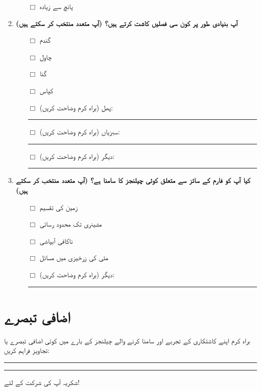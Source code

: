 \documentclass[12pt]{article}
\begin{document}
\begin{urdu}
\begin{enumerate}[label=\arabic*.]
\begin{itemize}
        \item [$\Box$] پانچ سے زیادہ
    \end{itemize}
    \item \textbf{آپ بنیادی طور پر کون سی فصلیں کاشت کرتے ہیں؟ (آپ متعدد منتخب کر سکتے ہیں)}
    \begin{itemize}
        \item [$\Box$] گندم
        \item [$\Box$] چاول
        \item [$\Box$] گنا
        \item [$\Box$] کپاس
        \item [$\Box$] پھل (براہ کرم وضاحت کریں): \rule{10cm}{0.4pt}
        \item [$\Box$] سبزیاں (براہ کرم وضاحت کریں): \rule{10cm}{0.4pt}
        \item [$\Box$] دیگر (براہ کرم وضاحت کریں): \rule{10cm}{0.4pt}
    \end{itemize}
    \item \textbf{کیا آپ کو فارم کے سائز سے متعلق کوئی چیلنجز کا سامنا ہے؟ (آپ متعدد منتخب کر سکتے ہیں)}
    \begin{itemize}
        \item [$\Box$] زمین کی تقسیم
        \item [$\Box$] مشینری تک محدود رسائی
        \item [$\Box$] ناکافی آبپاشی
        \item [$\Box$] مٹی کی زرخیزی میں مسائل
        \item [$\Box$] دیگر (براہ کرم وضاحت کریں): \rule{10cm}{0.4pt}
    \end{itemize}
\end{enumerate}

\section*{اضافی تبصرے}
براہ کرم اپنے کاشتکاری کے تجربے اور سامنا کرنے والے چیلنجز کے بارے میں کوئی اضافی تبصرے یا تجاویز فراہم کریں:
\rule{14.8cm}{0.4pt}

\rule{16cm}{0.4pt}

شکریہ آپ کی شرکت کے لئے!

\end{urdu}
\end{document}

